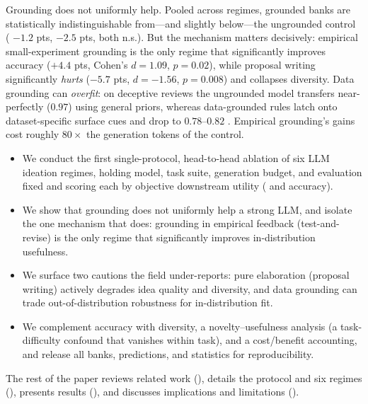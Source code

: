  Grounding does not uniformly help. Pooled across regimes,
grounded banks are statistically indistinguishable from---and slightly below---the
ungrounded control (\IND{} $-1.2$ pts, \OOD{} $-2.5$ pts, both n.s.). But the
mechanism matters decisively: empirical small-experiment grounding is the only
regime that significantly improves \IND{} accuracy ($+4.4$ pts, Cohen's $d=1.09$,
$p=0.02$), while proposal writing significantly \emph{hurts} ($-5.7$ pts, $d=-1.56$,
$p=0.008$) and collapses diversity. Data grounding can \emph{overfit}: on deceptive
reviews the ungrounded model transfers near-perfectly \OOD{} ($0.97$) using general
priors, whereas data-grounded rules latch onto dataset-specific surface cues and drop
to $0.78$--$0.82$ \OOD. Empirical grounding's gains cost roughly $80\times$ the
generation tokens of the control.

\begin{itemize}[leftmargin=*,itemsep=0pt,topsep=2pt]
    \item We conduct the first single-protocol, head-to-head ablation of six LLM
    ideation regimes, holding model, task suite, generation budget, and evaluation
    fixed and scoring each by objective downstream utility (\IND{} and \OOD{}
    accuracy).
    \item We show that grounding does not uniformly help a strong LLM, and isolate
    the one mechanism that does: grounding in empirical feedback (test-and-revise)
    is the only regime that significantly improves in-distribution usefulness.
    \item We surface two cautions the field under-reports: pure elaboration
    (proposal writing) actively degrades idea quality and diversity, and data
    grounding can trade out-of-distribution robustness for in-distribution fit.
    \item We complement accuracy with diversity, a novelty--usefulness analysis (a
    task-difficulty confound that vanishes within task), and a cost/benefit
    accounting, and release all banks, predictions, and statistics for reproducibility.
\end{itemize}

The rest of the paper reviews related work (), details the
protocol and six regimes (), presents results
(), and discusses implications and limitations
().
